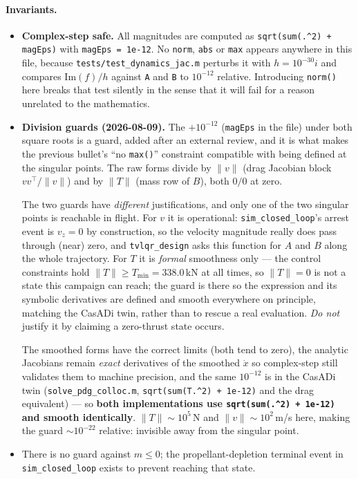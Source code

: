 \documentclass[11pt]{article}
\newcommand{\Tmin}{T_{\min}}
\newcommand{\file}[1]{\texttt{#1}}
\begin{document}
\paragraph{Invariants.}
\begin{itemize}
\item \textbf{Complex-step safe.} All magnitudes are computed as
\texttt{sqrt(sum(.\^{}2) + magEps)} with \texttt{magEps = 1e-12}. No
\texttt{norm}, \texttt{abs} or
\texttt{max} appears anywhere in this file, because
\file{tests/test\_dynamics\_jac.m} perturbs it with $h = 10^{-30}i$ and
compares $\mathrm{Im}(f)/h$ against
\texttt{A} and \texttt{B} to $10^{-12}$ relative. Introducing
\texttt{norm()} here breaks that test silently in the sense that it will
fail for a reason unrelated to the mathematics.
\item \textbf{Division guards (2026-08-09).} The $+10^{-12}$
(\texttt{magEps} in the file) under both square roots is a guard, added
after an external review, and it is what makes the previous bullet's ``no
\texttt{max()}'' constraint compatible with being defined at the singular
points. The raw forms divide by $\lVert v\rVert$ (drag Jacobian block
$vv^\top/\lVert v\rVert$) and by $\lVert T\rVert$ (mass row of $B$), both
$0/0$ at zero.

The two guards have \emph{different} justifications, and only one of the
two singular points is reachable in flight. For $v$ it is operational:
\texttt{sim\_closed\_loop}'s arrest event is $v_z = 0$ by construction, so
the velocity magnitude really does pass through (near) zero, and
\texttt{tvlqr\_design} asks this function for $A$ and $B$ along the whole
trajectory. For $T$ it is \emph{formal} smoothness only --- the control
constraints hold $\lVert T\rVert \ge \Tmin = 338.0$\,kN at all times, so
$\lVert T\rVert = 0$ is not a state this campaign can reach; the guard is
there so the expression and its symbolic derivatives are defined and
smooth everywhere on principle, matching the CasADi twin, rather than to
rescue a real evaluation. \emph{Do not} justify it by claiming a zero-thrust
state occurs.

The smoothed forms have the correct
limits (both tend to zero), the analytic Jacobians remain \emph{exact}
derivatives of the smoothed $\dot x$ so complex-step still validates them
to machine precision, and the same $10^{-12}$ is in the
CasADi twin (\file{solve\_pdg\_colloc.m}, \texttt{sqrt(sum(T.\^{}2) +
1e-12)} and the drag equivalent) --- so \textbf{both implementations use
\texttt{sqrt(sum(.\^{}2) + 1e-12)} and smooth identically}.
$\lVert T\rVert \sim 10^5$\,N and $\lVert v\rVert \sim 10^2$\,m/s here,
making the guard $\sim10^{-22}$ relative: invisible away from the singular
point.
\item There is no guard against $m \le 0$; the propellant-depletion
terminal event in \texttt{sim\_closed\_loop} exists to prevent reaching that
state.
\end{itemize}
\end{document}
